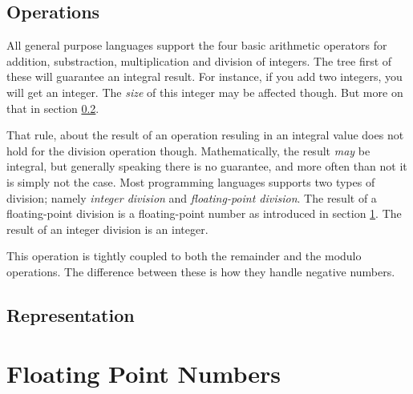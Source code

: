 \subsection{Operations}

All general purpose languages support the four basic arithmetic operators for addition, substraction, multiplication and division of integers. The tree first of these will guarantee an integral result. For instance, if you add two integers, you will get an integer. The \textsl{size} of this integer may be affected though. But more on that in section \ref{primitives:int:representation}.

That rule, about the result of an operation resuling in an integral value does not hold for the division operation though. Mathematically, the result \textsl{may} be integral, but generally speaking there is no guarantee, and more often than not it is simply not the case. Most programming languages supports two types of division; namely \textsl{integer division} and \textsl{floating-point division}. The result of a floating-point division is a floating-point number as introduced in section \ref{primitives:float}. The result of an integer division is an integer.

This operation is tightly coupled to both the remainder and the modulo operations. The difference between these is how they handle negative numbers.


\subsection{Representation}
\label{primitives:int:representation}



\csharpsubsection{\csharp}





\section{Floating Point Numbers}
\label{primitives:float}

